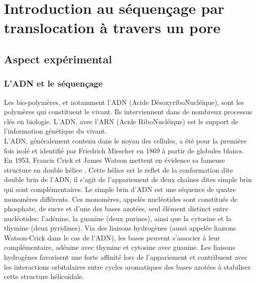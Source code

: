
\chapter{Introduction au séquençage par translocation à travers un pore}
\label{intro}

\minitoc

\newpage




\section{Aspect expérimental}

\subsection{L'ADN et le séquençage}

Les bio-polymères, et notamment l'ADN (Acide DésoxyriboNucléique), sont les polymères qui constituent le vivant. Ils interviennent dans de nombreux processus clés en biologie.  L'ADN, avec l'ARN (Acide RiboNucléique) est le support de l'information génétique du vivant. \\

L'ADN, généralement contenu dans le noyau des cellules, a été pour la première fois isolé et identifié par Friedrich Miescher en 1869 à partir de globules blancs. En 1953, Francis Crick et James Watson mettent en évidence sa fameuse structure en double hélice \cite{watsoncrick}. Cette hélice est le reflet de la conformation dite double brin de l'ADN, il s'agit de l'appariement de deux chaînes dites simple brin qui sont complémentaires. Le simple brin d'ADN est une séquence de quatre monomères différents. Ces monomères, appelés nucléotides sont constitués de phosphate, de sucre et d'une des bases azotées, seul élément distinct entre nucléotides: l'adénine, la guanine (deux purines), ainsi que la cytosine et la thymine (deux pyridines). Via des liaisons hydrogènes (aussi appelée liaisons Watson-Crick dans le cas de l'ADN), les bases peuvent s'associer à leur complémentaire, adénine avec thymine et cytosine avec guanine. Les liaisons hydrogènes favorisent une forte affinité lors de l'appariement et contribuent avec les interactions orbitalaires entre cycles aromatiques des bases azotées à stabiliser cette structure hélicoïdale.

